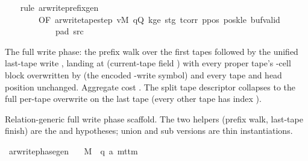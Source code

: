 \begin{isabellebody}
%
\isadelimproof
\ \ %
\endisadelimproof
%
\isatagproof
{}\isamarkupfalse%
\ {\isacharparenleft}{\kern0pt}rule\ ar{\isacharunderscore}{\kern0pt}write{\isacharunderscore}{\kern0pt}prefix{\isacharunderscore}{\kern0pt}gen\isanewline
\ \ \ \ \ \ \ \ {\isacharbrackleft}{\kern0pt}OF\ ar{\isacharunderscore}{\kern0pt}write{\isacharunderscore}{\kern0pt}tape{\isacharunderscore}{\kern0pt}step\ vM\ qQ\ kge{}\ stg{}\ tcorr\ ppos\ poskle\ buf{\isacharunderscore}{\kern0pt}valid\isanewline
\ \ \ \ \ \ \ \ \ \ \ \ pad{}\ src{}{\isacharbrackright}{\kern0pt}{\isacharparenright}{\kern0pt}%
\endisatagproof
{\isafoldproof}%
%
\isadelimproof
%
\endisadelimproof
%
\begin{isamarkuptext}%
The full write phase: the prefix walk over the first
   tapes followed by the unified last-tape write
  , landing at 
  (current-tape field ) with every proper tape's
  -cell block overwritten by  (the
  encoded -write symbol) and every  tape and head
  position unchanged.  Aggregate cost .
  The split tape descriptor collapses to the full per-tape overwrite on
  the last tape (every other tape has index ).%
\end{isamarkuptext}\isamarkuptrue%
%
\begin{isamarkuptext}%
Relation-generic full write phase scaffold.  The two
  helpers (prefix walk, last-tape finish) are the 
  and  hypotheses; union and sub versions are thin
  instantiations.%
\end{isamarkuptext}\isamarkuptrue%
\isamarkupfalse%
\ ar{\isacharunderscore}{\kern0pt}write{\isacharunderscore}{\kern0pt}phase{\isacharunderscore}{\kern0pt}gen{\isacharcolon}{\kern0pt}\isanewline
\ \ \ M\ {\isacharcolon}{\kern0pt}{\isacharcolon}{\kern0pt}\ {\isachardoublequoteopen}{\isacharparenleft}{\kern0pt}{\isacharprime}{\kern0pt}q{\isacharcomma}{\kern0pt}\ {\isacharprime}{\kern0pt}a{\isacharparenright}{\kern0pt}\ mttm{\isachardoublequoteclose}\isanewline

\end{isabellebody}
